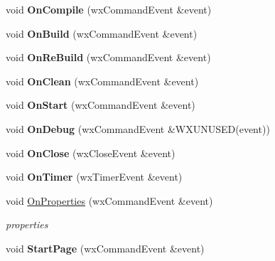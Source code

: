 \begin{DoxyCompactItemize}
\item 
\hypertarget{class_my_frame_a81f3ca63a2546ed79772b12fa1ed4860}{void {\bfseries On\+Compile} (wx\+Command\+Event \&event)}\label{class_my_frame_a81f3ca63a2546ed79772b12fa1ed4860}

\item 
\hypertarget{class_my_frame_a107bbf19b177e4f2d2759f8450dbd4fe}{void {\bfseries On\+Build} (wx\+Command\+Event \&event)}\label{class_my_frame_a107bbf19b177e4f2d2759f8450dbd4fe}

\item 
\hypertarget{class_my_frame_aff26e8d2566067e0a24a2516cf6ce4d6}{void {\bfseries On\+Re\+Build} (wx\+Command\+Event \&event)}\label{class_my_frame_aff26e8d2566067e0a24a2516cf6ce4d6}

\item 
\hypertarget{class_my_frame_ad61fe77b26b2c496f6d0298d9983ce78}{void {\bfseries On\+Clean} (wx\+Command\+Event \&event)}\label{class_my_frame_ad61fe77b26b2c496f6d0298d9983ce78}

\item 
\hypertarget{class_my_frame_a1f3d07e0f3b8faced4f900c91e4125ca}{void {\bfseries On\+Start} (wx\+Command\+Event \&event)}\label{class_my_frame_a1f3d07e0f3b8faced4f900c91e4125ca}

\item 
\hypertarget{class_my_frame_a4c6b9b384c8aa4bba4003ac4df76d43a}{void {\bfseries On\+Debug} (wx\+Command\+Event \&W\+X\+U\+N\+U\+S\+E\+D(event))}\label{class_my_frame_a4c6b9b384c8aa4bba4003ac4df76d43a}

\item 
\hypertarget{class_my_frame_aca8e8d9ade335e41689ae7ccbbc8675a}{void {\bfseries On\+Close} (wx\+Close\+Event \&event)}\label{class_my_frame_aca8e8d9ade335e41689ae7ccbbc8675a}

\item 
\hypertarget{class_my_frame_a4bfc00e8a9e246cc4adf7f1d7e2e780f}{void {\bfseries On\+Timer} (wx\+Timer\+Event \&event)}\label{class_my_frame_a4bfc00e8a9e246cc4adf7f1d7e2e780f}

\item 
\hypertarget{class_my_frame_a718e57f55665880c50a717212b88932f}{void \hyperlink{class_my_frame_a718e57f55665880c50a717212b88932f}{On\+Properties} (wx\+Command\+Event \&event)}\label{class_my_frame_a718e57f55665880c50a717212b88932f}

\begin{DoxyCompactList}\small\item\em properties \end{DoxyCompactList}\item 
\hypertarget{class_my_frame_aa7e1c75cc203a03ec1ff13d0a193da34}{void {\bfseries Start\+Page} (wx\+Command\+Event \&event)}\label{class_my_frame_aa7e1c75cc203a03ec1ff13d0a193da34}


\end{DoxyCompactItemize}
